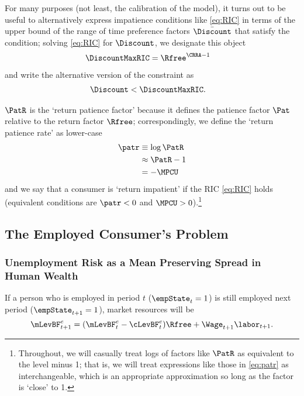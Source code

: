 \documentclass{\handout}
\begin{document}
For many purposes (not least, the calibration of the model), it turns out to be useful to alternatively express
impatience conditions like \eqref{eq:RIC} in terms of the upper bound of the range of time preference
factors $\bar{\Discount}$ that satisfy the condition; solving \eqref{eq:RIC} for $\Discount$, we designate this 
object 
\begin{equation}\begin{gathered}\begin{aligned}
  \DiscountMaxRIC & =  \Rfree^{\CRRA-1}
\end{aligned}\end{gathered}\end{equation}
and write the alternative version of the constraint as 
\begin{equation}\begin{gathered}\begin{aligned}
  \Discount & <  \DiscountMaxRIC \label{eq:DiscountMaxRIC}.
\end{aligned}\end{gathered}\end{equation}

$\PatR$ is the `return patience factor' because it defines the patience factor $\Pat$
relative to the return factor $\Rfree$; correspondingly, we define the `return
patience rate' as lower-case
\begin{equation}\begin{gathered}\begin{aligned}
   \patr & \equiv   \log \PatR \label{eq:patr}
\\ & \approx \PatR - 1 
\\ & =  -\MPCU
\end{aligned}\end{gathered}\end{equation}
and we say that a consumer is `return impatient' if the RIC \eqref{eq:RIC} holds (equivalent conditions are $\patr < 0$ and $\MPCU > 0$).\footnote{Throughout, we will casually treat logs of factors like $\PatR$ as equivalent to the level minus 1; that is, we will treat expressions like those in \eqref{eq:patr} as interchangeable, which is an appropriate approximation so long as the factor is `close' to 1.}

\subsection{The Employed Consumer's Problem}

\subsubsection{Unemployment Risk as a Mean Preserving Spread in Human Wealth} \label{subsubsec:uMPS}
If a person who is employed in period $t$ ($\empState_{t}=1$) is still employed next
period ($\empState_{t+1}=1$), market resources will be
\begin{equation}
\mLevBF^{e}_{t+1} = (\mLevBF^{e}_{t}-\cLevBF^{e}_{t})\Rfree+\Wage_{t+1}\labor_{t+1}. \label{eq:Metp1}
\end{equation}
\end{document}
